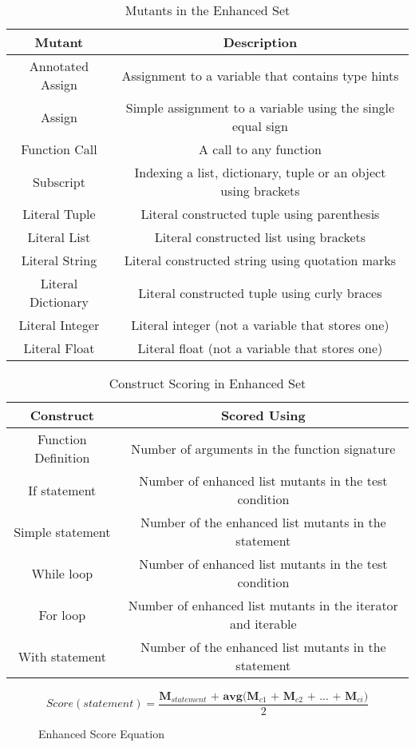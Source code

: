 \begin{table}[!htb]
	\centering
	\begin{tabular}{|c|c|}
	 \hline
	 Mutant & Description \\
	 \hline
	 Annotated Assign & Assignment to a variable that contains type hints \\
	 Assign & Simple assignment to a variable using the single equal sign  \\
	 Function Call & A call to any function \\
	 Subscript & Indexing a list, dictionary, tuple or an object using brackets \\
	 Literal Tuple & Literal constructed tuple using parenthesis \\
	 Literal List & Literal constructed list using brackets \\
	 Literal String &  Literal constructed string using quotation marks \\
	 Literal Dictionary &  Literal constructed tuple using curly braces \\
	 Literal Integer &  Literal integer (not a variable that stores one) \\
	 Literal Float &  Literal float (not a variable that stores one) \\

	 \hline
	\end{tabular}
	\caption{Mutants in the Enhanced Set}
	\label{table:enhanced_set_mutants}
\end{table}

\begin{table}[!htb]
	\centering
	\begin{tabular}{|c|c|}
	 \hline
	 Construct & Scored Using \\
	 \hline
	 Function Definition & Number of arguments in the function signature \\
	 If statement & Number of enhanced list mutants in the test condition  \\
	 Simple statement & Number of the enhanced list mutants in the statement \\
	 While loop & Number of enhanced list mutants in the test condition \\
	 For loop & Number of enhanced list mutants in the iterator and iterable \\
	 With statement & Number of the enhanced list mutants in the statement \\

	 \hline
	\end{tabular}
	\caption{Construct Scoring in Enhanced Set}
	\label{table:construct_scoring}
\end{table}


\begin{figure}[!htb]
	\begin{center}
		\begin{equation}
			Score(statement) = \frac{\textbf{M$_{statement}$ + avg(M$_{c1}$ + M$_{c2}$ + ... + M$_{ci}$)}}{2}
		\end{equation}
		\caption{\label{fig:enhanced_score_equation} Enhanced Score Equation}
	\end{center}
\end{figure}


